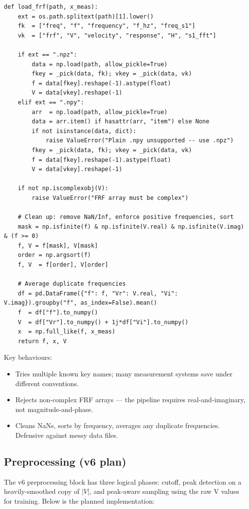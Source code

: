 \documentclass[11pt,a4paper]{article}
\begin{document}
\begin{lstlisting}[caption={The data loading function}]
def load_frf(path, x_meas):
    ext = os.path.splitext(path)[1].lower()
    fk  = ["freq", "f", "frequency", "f_hz", "freq_s1"]
    vk  = ["frf", "V", "velocity", "response", "H", "s1_fft"]

    if ext == ".npz":
        data = np.load(path, allow_pickle=True)
        fkey = _pick(data, fk); vkey = _pick(data, vk)
        f = data[fkey].reshape(-1).astype(float)
        V = data[vkey].reshape(-1)
    elif ext == ".npy":
        arr  = np.load(path, allow_pickle=True)
        data = arr.item() if hasattr(arr, "item") else None
        if not isinstance(data, dict):
            raise ValueError("Plain .npy unsupported -- use .npz")
        fkey = _pick(data, fk); vkey = _pick(data, vk)
        f = data[fkey].reshape(-1).astype(float)
        V = data[vkey].reshape(-1)

    if not np.iscomplexobj(V):
        raise ValueError("FRF array must be complex")

    # Clean up: remove NaN/Inf, enforce positive frequencies, sort
    mask = np.isfinite(f) & np.isfinite(V.real) & np.isfinite(V.imag) & (f >= 0)
    f, V = f[mask], V[mask]
    order = np.argsort(f)
    f, V  = f[order], V[order]

    # Average duplicate frequencies
    df = pd.DataFrame({"f": f, "Vr": V.real, "Vi": V.imag}).groupby("f", as_index=False).mean()
    f  = df["f"].to_numpy()
    V  = df["Vr"].to_numpy() + 1j*df["Vi"].to_numpy()
    x  = np.full_like(f, x_meas)
    return f, x, V
\end{lstlisting}

Key behaviours:
\begin{itemize}[leftmargin=*, itemsep=2pt]
\item Tries multiple known key names; many measurement systems save under different conventions.
\item Rejects non-complex FRF arrays --- the pipeline requires real-and-imaginary, not magnitude-and-phase.
\item Cleans NaNs, sorts by frequency, averages any duplicate frequencies. Defensive against messy data files.
\end{itemize}

\subsection{Preprocessing (v6 plan)}

The v6 preprocessing block has three logical phases: cutoff, peak detection on a heavily-smoothed copy of $|V|$, and peak-aware sampling using the raw V values for training. Below is the planned implementation:
\end{document}
